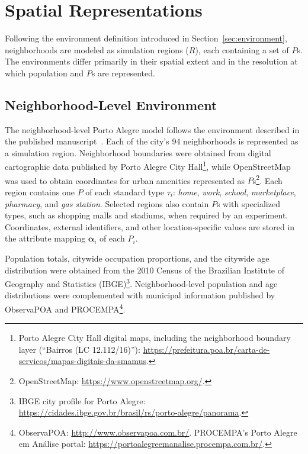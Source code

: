 \section{Spatial Representations}
\label{sec:spatial_representations}

Following the environment definition introduced in Section~\ref{sec:environment}, neighborhoods are modeled as simulation regions ($R$), each containing a set of $P$s. The environments differ primarily in their spatial extent and in the resolution at which population and $P$s are represented.


\subsection{Neighborhood-Level Environment}
\label{sec:neighborhood_level_environments}

The neighborhood-level Porto Alegre model follows the environment described in the published manuscript~\cite{silva2026lodusPop}. Each of the city's 94 neighborhoods is represented as a simulation region. 
Neighborhood boundaries were obtained from digital cartographic data published by Porto Alegre City Hall\footnote{Porto Alegre City Hall digital maps, including the neighborhood boundary layer (``Bairros (LC 12.112/16)''): \url{https://prefeitura.poa.br/carta-de-servicos/mapas-digitais-da-smamus}.}, while OpenStreetMap was used to obtain coordinates for urban amenities represented as $P$s\footnote{OpenStreetMap: \url{https://www.openstreetmap.org/}.}. 
Each region contains one $P$ of each standard type $\tau_i$: \textit{home}, \textit{work}, \textit{school}, \textit{marketplace}, \textit{pharmacy}, and \textit{gas station}.
Selected regions also contain $P$s with specialized types, such as shopping malls and stadiums, when required by an experiment. Coordinates, external identifiers, and other location-specific values are stored in the attribute mapping $\bm{\alpha}_i$ of each $P_i$.


Population totals, citywide occupation proportions, and the citywide age distribution were obtained from the 2010 Census of the Brazilian Institute of Geography and Statistics (IBGE)\footnote{IBGE city profile for Porto Alegre: \url{https://cidades.ibge.gov.br/brasil/rs/porto-alegre/panorama}.}. Neighborhood-level population and age distributions were complemented with municipal information published by ObservaPOA and PROCEMPA\footnote{ObservaPOA: \url{http://www.observapoa.com.br/}. PROCEMPA's Porto Alegre em Análise portal: \url{https://portoalegreemanalise.procempa.com.br/}.}.


